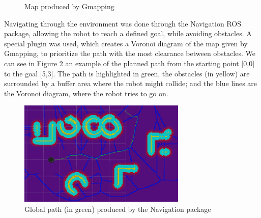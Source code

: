\documentclass[11pt,a4paper,twocolumn]{article}
\begin{document}
\begin{figure}[ht!]%
	\centering
    \qquad  
    \caption{Map produced by Gmapping}
    \label{fig:gmapping}
\end{figure}

Navigating through the environment was done through the Navigation ROS package, allowing the robot to reach a defined goal, while avoiding obstacles. A special plugin  was used, which creates a Voronoi diagram of the map given by Gmapping, to prioritize the path with the most clearance between obstacles. We can see in Figure \ref{fig:globalPath} an example of the planned path from the starting point [0,0] to the goal [5,3]. The path is highlighted in green, the obstacles (in yellow) are surrounded by a buffer area where the robot might collide; and the blue lines are the Voronoi diagram, where the robot tries to go on.

\begin{figure}[h!]
	\centering
    \includegraphics[width=8cm]{globalplan53.png}
    \caption{Global path (in green) produced by the Navigation package}
    \label{fig:globalPath}
\end{figure}
\end{document}
